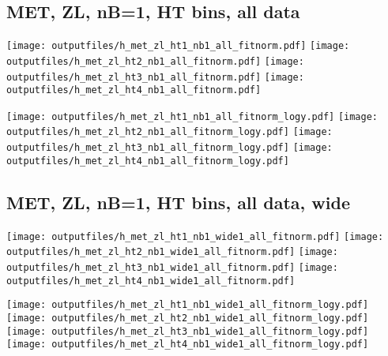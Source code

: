 \documentclass[11pt]{article}
\begin{document}
     \subsection{ MET, ZL, nB=1, HT bins, all data}

    \noindent
     \texttt{[image: outputfiles/h\_met\_zl\_ht1\_nb1\_all\_fitnorm.pdf]}
     \texttt{[image: outputfiles/h\_met\_zl\_ht2\_nb1\_all\_fitnorm.pdf]}
     \texttt{[image: outputfiles/h\_met\_zl\_ht3\_nb1\_all\_fitnorm.pdf]}
     \texttt{[image: outputfiles/h\_met\_zl\_ht4\_nb1\_all\_fitnorm.pdf]}

    \noindent
     \texttt{[image: outputfiles/h\_met\_zl\_ht1\_nb1\_all\_fitnorm\_logy.pdf]}
     \texttt{[image: outputfiles/h\_met\_zl\_ht2\_nb1\_all\_fitnorm\_logy.pdf]}
     \texttt{[image: outputfiles/h\_met\_zl\_ht3\_nb1\_all\_fitnorm\_logy.pdf]}
     \texttt{[image: outputfiles/h\_met\_zl\_ht4\_nb1\_all\_fitnorm\_logy.pdf]}


    \clearpage
     \subsection{ MET, ZL, nB=1, HT bins, all data, wide}

    \noindent
     \texttt{[image: outputfiles/h\_met\_zl\_ht1\_nb1\_wide1\_all\_fitnorm.pdf]}
     \texttt{[image: outputfiles/h\_met\_zl\_ht2\_nb1\_wide1\_all\_fitnorm.pdf]}
     \texttt{[image: outputfiles/h\_met\_zl\_ht3\_nb1\_wide1\_all\_fitnorm.pdf]}
     \texttt{[image: outputfiles/h\_met\_zl\_ht4\_nb1\_wide1\_all\_fitnorm.pdf]}

    \noindent
     \texttt{[image: outputfiles/h\_met\_zl\_ht1\_nb1\_wide1\_all\_fitnorm\_logy.pdf]}
     \texttt{[image: outputfiles/h\_met\_zl\_ht2\_nb1\_wide1\_all\_fitnorm\_logy.pdf]}
     \texttt{[image: outputfiles/h\_met\_zl\_ht3\_nb1\_wide1\_all\_fitnorm\_logy.pdf]}
     \texttt{[image: outputfiles/h\_met\_zl\_ht4\_nb1\_wide1\_all\_fitnorm\_logy.pdf]}


    \clearpage
\end{document}
